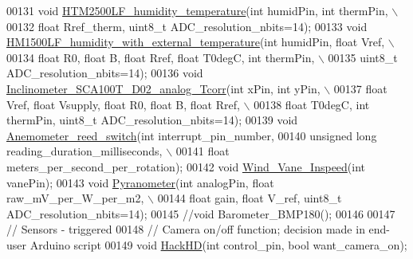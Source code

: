 \begin{DoxyCode}
00131     \textcolor{keywordtype}{void} \hyperlink{classLogger_a4ccff7a14a6bddc8bb28e22b3b36d3cc}{HTM2500LF\_humidity\_temperature}(\textcolor{keywordtype}{int} humidPin, \textcolor{keywordtype}{int} thermPin, \(\backslash\)
00132          \textcolor{keywordtype}{float} Rref\_therm, uint8\_t ADC\_resolution\_nbits=14);
00133     \textcolor{keywordtype}{void} \hyperlink{classLogger_af0eda5a0be93a4d8505c7493d0f5e333}{HM1500LF\_humidity\_with\_external\_temperature}(\textcolor{keywordtype}{int} 
      humidPin, \textcolor{keywordtype}{float} Vref, \(\backslash\)
00134          \textcolor{keywordtype}{float} R0, \textcolor{keywordtype}{float} B, \textcolor{keywordtype}{float} Rref, \textcolor{keywordtype}{float} T0degC, \textcolor{keywordtype}{int} thermPin, \(\backslash\)
00135          uint8\_t ADC\_resolution\_nbits=14);
00136     \textcolor{keywordtype}{void} \hyperlink{classLogger_a91ffb193feceb75b2e19a3617d00455c}{Inclinometer\_SCA100T\_D02\_analog\_Tcorr}(\textcolor{keywordtype}{int} xPin, \textcolor{keywordtype}{int} yPin, \(\backslash\)
00137          \textcolor{keywordtype}{float} Vref, \textcolor{keywordtype}{float} Vsupply, \textcolor{keywordtype}{float} R0, \textcolor{keywordtype}{float} B, \textcolor{keywordtype}{float} Rref, \(\backslash\)
00138          \textcolor{keywordtype}{float} T0degC, \textcolor{keywordtype}{int} thermPin, uint8\_t ADC\_resolution\_nbits=14);
00139     \textcolor{keywordtype}{void} \hyperlink{classLogger_a6c6a43a1b86f88c2a5e33d14c992e510}{Anemometer\_reed\_switch}(\textcolor{keywordtype}{int} interrupt\_pin\_number, 
00140          \textcolor{keywordtype}{unsigned} \textcolor{keywordtype}{long} reading\_duration\_milliseconds, \(\backslash\)
00141          \textcolor{keywordtype}{float} meters\_per\_second\_per\_rotation);
00142     \textcolor{keywordtype}{void} \hyperlink{classLogger_a31c3cba5ff5722fb66bf540bfbe8b25d}{Wind\_Vane\_Inspeed}(\textcolor{keywordtype}{int} vanePin);
00143     \textcolor{keywordtype}{void} \hyperlink{classLogger_ae4190ce7ccfd7b148a6151102a3bf93d}{Pyranometer}(\textcolor{keywordtype}{int} analogPin, \textcolor{keywordtype}{float} raw\_mV\_per\_W\_per\_m2, \(\backslash\)
00144          \textcolor{keywordtype}{float} gain, \textcolor{keywordtype}{float} V\_ref, uint8\_t ADC\_resolution\_nbits=14);
00145     \textcolor{comment}{//void Barometer\_BMP180();}
00146     
00147     \textcolor{comment}{// Sensors - triggered}
00148     \textcolor{comment}{// Camera on/off function; decision made in end-user Arduino script}
00149     \textcolor{keywordtype}{void} \hyperlink{classLogger_a923b296832bd4222da649ebc66427ac1}{HackHD}(\textcolor{keywordtype}{int} control\_pin, \textcolor{keywordtype}{bool} want\_camera\_on);

\end{DoxyCode}
